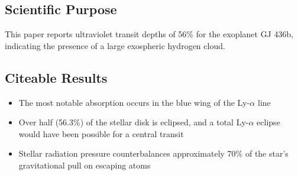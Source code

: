 \documentclass[onecolumn]{aastex63}
\begin{document}

\subsection{Scientific Purpose}
This paper reports ultraviolet transit depths of 56\% for the exoplanet GJ 436b, indicating the presence of a large exospheric hydrogen cloud.


\subsection{Citeable Results}
\begin{itemize}
    \item The most notable absorption occurs in the blue wing of the Ly-$\alpha$ line
    \item Over half (56.3\%) of the stellar disk is eclipsed, and a total Ly-$\alpha$ eclipse would have been possible for a central transit
    \item Stellar radiation pressure counterbalances approximately 70\% of the star's gravitational pull on escaping atoms
\end{itemize}



\end{document}
